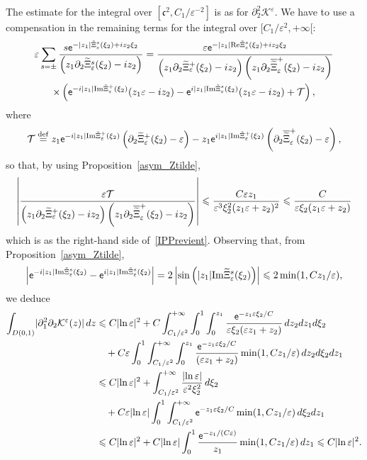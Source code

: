 \documentclass[10pt]{amsart}
\theoremstyle{definition}\newtheorem{defi}[theo]{Definition}\newtheorem{rema}[theo]{Remark}\newtheorem{exam}[theo]{Example}\newtheorem{exem}[theo]{Example}\newtheorem{nota}[theo]{Notation}
\newcommand*\p{\partial}
\newcommand*\ddef{\stackrel{\rm def}{=}}
\newcommand{\Imm}{\mathrm{Im}}
\newcommand{\Rel}{\mathrm{Re}}
\newcommand*\BK{\mathcal{K}}
\newcommand*\BT{\mathcal{T}}
\newcommand*\ex{{\sf e}}
\newcommand*\cs{{\mathfrak c}}
\newcommand*\ii{\infty}
\newcommand*\ls{\leqslant }
\newcommand*\e{\varepsilon}
\newcommand*\lne{\lvert \ln \varepsilon \rvert}
\renewcommand*\t{\tilde}
\let\oldtilde\tilde
\renewcommand*{\tilde}[1]{\mathchoice{\widetilde{#1}}{\widetilde{#1}}{\oldtilde{#1}}{\oldtilde{#1}}}
\begin{document}
The estimate for the integral over $ [\cs^2, C_1 / \e^{-2}] $ is as for $ \p_2^2 \BK^\e $. We have to use a compensation in the remaining terms for the integral over $ [C_1 / \e^{2}, +\ii [$:
\begin{multline*}
\e \sum_{s = \pm}
\frac{s \ex^{- |z_1| \t\Xi_\e^s (\xi_2) + i z_2 \xi_2} }{\left(z_1 \p_2 \t\Xi_\e^s (\xi_2) - i z_2\right)}
= \frac{\e \ex^{- |z_1| \Rel \t\Xi_\e^s (\xi_2) + i z_2 \xi_2}}{\left(z_1 \p_2 \t\Xi_\e^+ (\xi_2) - i z_2\right)\left(z_1 \p_2 \overline{\t\Xi}_\e^+ (\xi_2) - i z_2\right)} \\
\times \left(\ex^{- i |z_1| {\Imm} \t\Xi_\e^+ (\xi_2) } (z_1 \e - i z_2) - \ex^{ i |z_1| {\Imm} \t\Xi_\e^s (\xi_2) } (z_1 \e - i z_2) + \BT \right),
\end{multline*}
where
\[
\BT \ddef z_1 \ex^{- i |z_1| {\Imm} \t\Xi_\e^+ (\xi_2) } \left(\p_2 \t\Xi_\e^+ (\xi_2) - \e\right) - z_1 \ex^{ i |z_1| {\Imm} \t\Xi_\e^+ (\xi_2) }\left(\p_2 \overline{\t\Xi}_\e^+ (\xi_2) - \e\right),
\]
so that, by using Proposition~\ref{asym_Ztilde},
\[
\left\lvert \frac{ \e \BT }{\left(z_1 \p_2 \t\Xi_\e^+ (\xi_2) - i z_2\right)\left(z_1 \p_2 \overline{\t\Xi}_\e^+ (\xi_2) - i z_2\right) } \right\rvert
\ls \frac{C \e z_1 }{\e^3 \xi_2^2 (z_1 \e + z_2)^2 }
\ls \frac{C }{\e \xi_2 (z_1 \e + z_2) }
\]
which is as the right-hand side of~\eqref{IPPrevient}. Observing that, from Proposition~\ref{asym_Ztilde},
\[
\left\lvert \ex^{ - i |z_1| {\Imm} \t\Xi_\e^s (\xi_2) } - \ex^{ i |z_1| {\Imm} \t\Xi_\e^s (\xi_2) } \right\rvert = 2 \left\lvert \sin \left(|z_1| {\Imm} \t\Xi_\e^s (\xi_2) \right) \right\rvert
\ls 2 \min (1, C z_1/ \e),
\]
we deduce
\begin{align*}
\int_{D(0,1)} \lvert \p_1^2 \p_2 \BK^\e (z) \rvert \, dz & \ls C \lvert \ln \e \rvert^2 + C \int_{ C_1 / \e^{2} }^{ +\ii } \int_0^1 \int_0^{z_1} \frac{ \ex^{- z_1 \e \xi_2 /C } }{ \e \xi_2 (\e z_1 + z_2)} \, dz_2 d z_1 d\xi_2
\\ & \quad + C \e \int_0^1 \int_{ C_1 / \e^{2} }^{ +\ii } \int_0^{z_1} \frac{ \ex^{- z_1 \e \xi_2 /C } }{ (\e z_1 + z_2)} \min (1, C z_1/ \e) \, dz_2 d\xi_2 d z_1
\\ & \ls C \lvert \ln \e \rvert^2 + \int_{C_1/ \e^{2} }^{+\ii } \frac{\lne}{ \e^2 \xi_2^2 } \, d \xi_2
\\ & \quad + C \e \lne \int_0^1 \int_{C_1/ \e^{2} }^{+\ii } \ex^{- z_1 \e \xi_2 /C } \min (1, C z_1/ \e) \, d \xi_2 d z_1
\\
& \ls C \lvert \ln \e \rvert^2 + C \lne \int_0^1 \frac{\ex^{- z_1 / (C \e) } }{z_1 } \min (1, C z_1/ \e) \, d z_1
\ls C \lvert \ln \e \rvert^2.
\end{align*}
\end{document}

